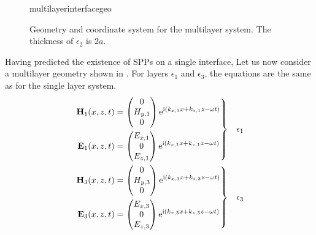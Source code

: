 \begin{figure}[ht]
 \centering
 {multilayerinterfacegeo}
 \caption{Geometry and coordinate system for the multilayer system. The
 thickness of $\epsilon_2$ is $2a$.}
 \label{fig:multilayergeo}
\end{figure}
Having predicted the existence of SPPs on a single interface, Let us now
consider a multilayer geometry shown in .  For
layers $\epsilon_1$ and $\epsilon_3$, the equations are the same as for the
single layer system.
\begin{align}
\left.\begin{aligned}
\mathbf{H}_1(x,z,t) &=
\begin{pmatrix}
0\\
H_{y,1}\\
0
\end{pmatrix} {\mathrm{e}}^{{\mathrm{i}}(k_{x,1}x+k_{z,1}z-\omega t)}\\
\mathbf{E}_1(x,z,t) &=
\begin{pmatrix}
E_{x,1}\\
0\\
E_{z,1}\\
\end{pmatrix} {\mathrm{e}}^{{\mathrm{i}}(k_{x,1}x+k_{z,1}z-\omega t)}
\end{aligned}
\right\}& \quad \epsilon_1\label{eqn:lrsppplanewavedielectric}\\
\left.\begin{aligned}
\mathbf{H}_3(x,z,t) &=
\begin{pmatrix}
0\\
H_{y,3}\\
0
\end{pmatrix}
{\mathrm{e}}^{{\mathrm{i}}(k_{x,3}x+k_{z,3}z-\omega t)}\\
\mathbf{E}_3(x,z,t) &=
\begin{pmatrix}
E_{x,3}\\
0\\
E_{z,3}\\
\end{pmatrix}
{\mathrm{e}}^{{\mathrm{i}}(k_{x,3}x+k_{z,3}z-\omega t)}
\end{aligned} 
\right\}&\quad \epsilon_3
\label{eqn:lrsppplanewavemetal}
\end{align}

